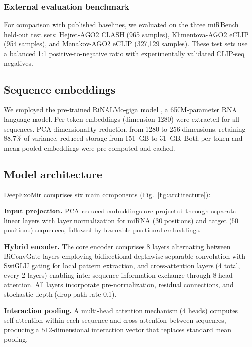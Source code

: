 \documentclass[unnumsec,webpdf,contemporary,large]{oup-authoring-template}
\begin{document}
\subsubsection{External evaluation benchmark}
For comparison with published baselines, we evaluated on the three miRBench held-out test sets: Hejret-AGO2 CLASH (965 samples), Klimentova-AGO2 eCLIP (954 samples), and Manakov-AGO2 eCLIP (327,129 samples). These test sets use a balanced 1:1 positive-to-negative ratio with experimentally validated CLIP-seq negatives.

\subsection{Sequence embeddings}

We employed the pre-trained RiNALMo-giga model \citep{penic2025}, a 650M-parameter RNA language model. Per-token embeddings (dimension 1280) were extracted for all sequences. PCA dimensionality reduction from 1280 to 256 dimensions, retaining 88.7\% of variance, reduced storage from 151~GB to 31~GB. Both per-token and mean-pooled embeddings were pre-computed and cached.

\subsection{Model architecture}

DeepExoMir comprises six main components (Fig.~\ref{fig:architecture}):

\textbf{Input projection.} PCA-reduced embeddings are projected through separate linear layers with layer normalization for miRNA (30 positions) and target (50 positions) sequences, followed by learnable positional embeddings.

\textbf{Hybrid encoder.} The core encoder comprises 8 layers alternating between BiConvGate layers employing bidirectional depthwise separable convolution with SwiGLU gating \citep{gu2023,shazeer2020} for local pattern extraction, and cross-attention layers (4 total, every 2 layers) enabling inter-sequence information exchange through 8-head attention. All layers incorporate pre-normalization, residual connections, and stochastic depth (drop path rate 0.1).

\textbf{Interaction pooling.} A multi-head attention mechanism (4 heads) computes self-attention within each sequence and cross-attention between sequences, producing a 512-dimensional interaction vector that replaces standard mean pooling.
\end{document}
